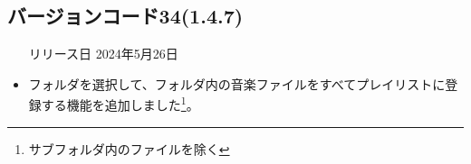 \subsection*{バージョンコード34(1.4.7)}
\begin{itemize}
    \item[リリース日] 2024年5月26日
\end{itemize}

\new
\begin{itemize}
    \item フォルダを選択して、フォルダ内の音楽ファイルをすべてプレイリストに登録する機能を追加しました\footnote{サブフォルダ内のファイルを除く}。
\end{itemize}

\change

\fix

